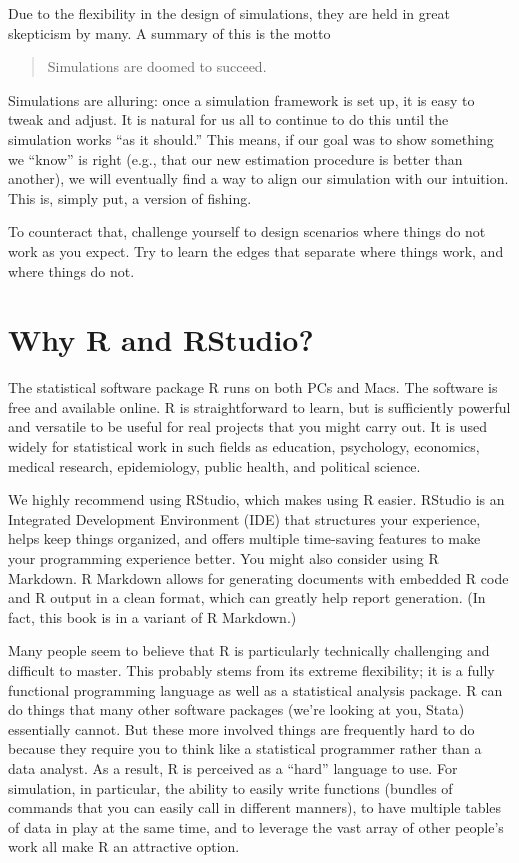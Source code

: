 \documentclass[
]{book}
\begin{document}
Due to the flexibility in the design of simulations, they are held in great skepticism by many.
A summary of this is the motto

\begin{quote}
Simulations are doomed to succeed.
\end{quote}

Simulations are alluring: once a simulation framework is set up, it is easy to tweak and adjust.
It is natural for us all to continue to do this until the simulation works ``as it should.''
This means, if our goal was to show something we ``know'' is right (e.g., that our new estimation procedure is better than another), we will eventually find a way to align our simulation with our intuition.
This is, simply put, a version of fishing.

To counteract that, challenge yourself to design scenarios where things do not work as you expect.
Try to learn the edges that separate where things work, and where things do not.

\hypertarget{why-r-and-rstudio}{%
\section{Why R and RStudio?}\label{why-r-and-rstudio}}

The statistical software package R runs on both PCs and Macs. The software is free and available online.
R is straightforward to learn, but is sufficiently powerful and versatile to be useful for real projects that you might carry out.
It is used widely for statistical work in such fields as education, psychology, economics, medical research, epidemiology, public health, and political science.

We highly recommend using RStudio, which makes using R easier. RStudio is an Integrated Development Environment (IDE) that structures your experience, helps keep things organized, and offers multiple time-saving features to make your programming experience better. You might also consider using R Markdown. R Markdown allows for generating documents with embedded R code and R output in a clean format, which can greatly help report generation.
(In fact, this book is in a variant of R Markdown.)

Many people seem to believe that R is particularly technically challenging and difficult to master. This probably stems from its extreme flexibility; it is a fully functional programming language as well as a statistical analysis package. R can do things that many other software packages (we're looking at you, Stata) essentially cannot.
But these more involved things are frequently hard to do because they require you to think like a statistical programmer rather than a data analyst.
As a result, R is perceived as a ``hard'' language to use.
For simulation, in particular, the ability to easily write functions (bundles of commands that you can easily call in different manners), to have multiple tables of data in play at the same time, and to leverage the vast array of other people's work all make R an attractive option.
\end{document}
